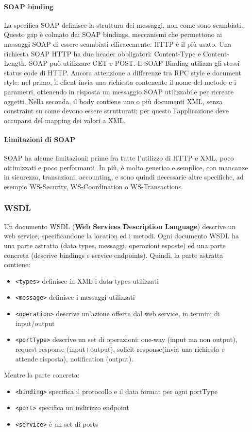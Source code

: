 \documentclass[11pt]{article}
\newcommand{\code}[1]{\texttt{#1}}
\begin{document}
\paragraph{SOAP binding} La specifica SOAP definisce la struttura dei messaggi, non come sono scambiati. Questo gap è colmato dai SOAP bindings, meccanismi che permettono ai messaggi SOAP di essere scambiati efficacemente. HTTP è il più usato. Una richiesta SOAP HTTP ha due header obbligatori: Content-Type e Content-Length. SOAP può utilizzare GET e POST. Il SOAP Binding utilizza gli stessi status code di HTTP. Ancora attenzione a differenze tra RPC style e document style: nel primo, il client invia una richiesta contenente il nome del metodo e i parametri, ottenendo in risposta un messaggio SOAP utilizzabile per ricreare oggetti. Nella seconda, il body contiene uno o più documenti XML, senza constraint su come devono essere strutturati: per questo l'applicazione deve occuparsi del mapping dei valori a XML. 
\paragraph{Limitazioni di SOAP} SOAP ha alcune limitazioni: prime fra tutte l'utilizzo di HTTP e XML, poco ottimizzati e poco performanti. In più, è molto generico e semplice, con mancanze in sicurezza, transazioni, accounting, e sono quindi necessarie altre specifiche, ad esempio WS-Security, WS-Coordination o WS-Transactions.

\subsubsection{WSDL}
Un documento WSDL (\textbf{Web Services Description Language}) descrive un web service, specificandone la location ed i metodi. Ogni documento WSDL ha una parte astratta (data types, messaggi, operazioni esposte) ed una parte concreta (descrive bindings e service endpoints). Quindi, la parte astratta contiene:
\begin{itemize}
    \item \code{<types>} definisce in XML i data types utilizzati 
    \item \code{<message>} definisce i messaggi utilizzati
    \item \code{<operation>} descrive un'azione offerta dal web service, in termini di input/output 
    \item \code{<portType>} descrive un set di operazioni: one-way (input ma non output), request-response (input+output), solicit-response(invia una richiesta e attende risposta), notification (output). 
\end{itemize}
Mentre la parte concreta:
\begin{itemize}
    \item \code{<binding>} specifica il protocollo e il data format per ogni portType 
    \item \code{<port>} specifica un indirizzo endpoint 
    \item \code{<service>} è un set di ports
\end{itemize}
\end{document}

